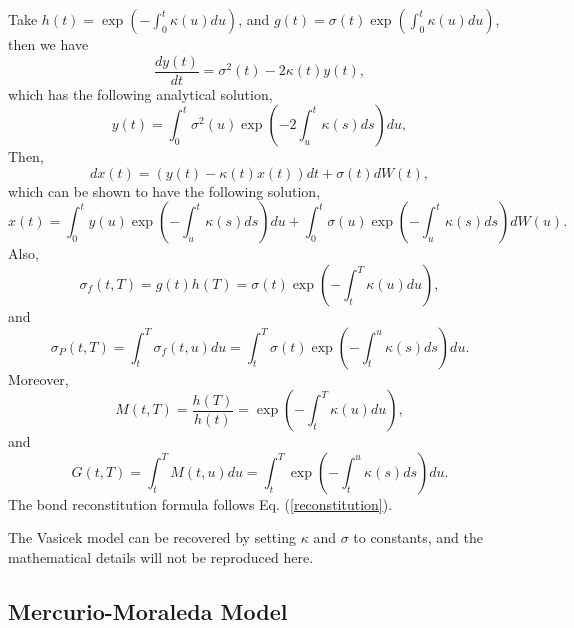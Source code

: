 \documentclass[12pt]{article}
\begin{document}
  Take $h(t)=\exp\left(-\int_0^t\kappa(u)du\right)$, and $g(t)=\sigma(t)\exp\left(\int_0^t\kappa(u)du\right)$, then we have
  \begin{equation}
    \frac{dy(t)}{dt} = \sigma^2(t) - 2\kappa(t)y(t),
  \end{equation}
  which has the following analytical solution,
  \begin{equation}
    y(t)=\int_0^t\sigma^2(u)\exp\left(-2\int_u^t\kappa(s)ds\right)du,
  \end{equation}
  Then,
  \begin{equation}
    dx(t)=\left(y(t)-\kappa(t)x(t)\right)dt+\sigma(t)dW(t),
  \end{equation}
  which can be shown to have the following solution,
  \begin{equation}
    x(t)=\int_0^ty(u)\exp\left(-\int_u^t\kappa(s)ds\right)du+\int_0^t\sigma(u)\exp\left(-\int_u^t\kappa(s)ds\right)dW(u).
  \end{equation}
  Also,
  \begin{equation}
    \sigma_f(t,T)=g(t)h(T)=\sigma(t)\exp\left(-\int_t^T\kappa(u)du\right),
  \end{equation}
  and
  \begin{equation}
    \sigma_P(t,T)=\int_t^T\sigma_f(t,u)du=\int_t^T\sigma(t)\exp\left(-\int_t^u\kappa(s)ds\right)du.
  \end{equation}
  Moreover,
  \begin{equation}
    M(t,T)=\frac{h(T)}{h(t)}=\exp\left(-\int_t^T\kappa(u)du\right),
  \end{equation}
  and
  \begin{equation}
    G(t,T)=\int_t^TM(t,u)du=\int_t^T\exp\left(-\int_t^u\kappa(s)ds\right)du.
  \end{equation}
  The bond reconstitution formula follows Eq. (\ref{reconstitution}).

  The Vasicek model can be recovered by setting $\kappa$ and $\sigma$ to constants, and the mathematical details will not be reproduced here.


  \subsection{Mercurio-Moraleda Model}
\end{document}
